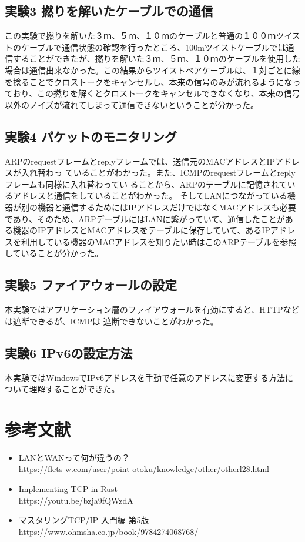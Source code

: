 \documentclass[10pt]{article}
\begin{document}
\subsection{実験3 撚りを解いたケーブルでの通信 }
この実験で撚りを解いた３ｍ、５ｍ、１０ｍのケーブルと普通の１００ｍツイストのケーブルで通信状態の確認を行ったところ、100mツイストケーブルでは通信することができたが、撚りを解いた３ｍ、５ｍ、１０ｍのケーブルを使用した場合は通信出来なかった。この結果からツイストペアケーブルは、１対ごとに線を捻ることでクロストークをキャンセルし、本来の信号のみが流れるようになっており、この撚りを解くとクロストークをキャンセルできなくなり、本来の信号以外のノイズが流れてしまって通信できないということが分かった。

\subsection{実験4 パケットのモニタリング}
ARPのrequestフレームとreplyフレームでは、送信元のMACアドレスとIPアドレスが入れ替わっ
ていることがわかった。また、ICMPのrequestフレームとreplyフレームも同様に入れ替わってい
ることから、ARPのテーブルに記憶されているアドレスと通信をしていることがわかった。
そしてLANにつながっている機器が別の機器と通信するためにはIPアドレスだけではなくMACアドレスも必要であり、そのため、ARPデーブルにはLANに繋がっていて、通信したことがある機器のIPアドレスとMACアドレスをテーブルに保存していて、あるIPアドレスを利用している機器のMACアドレスを知りたい時はこのARPテーブルを参照していることが分かった。

\subsection{実験5 ファイアウォールの設定 }
本実験ではアプリケーション層のファイアウォールを有効にすると、HTTPなどは遮断できるが、ICMPは
遮断できないことがわかった。

\subsection{実験6 IPv6の設定方法}
 本実験ではWindowsでIPv6アドレスを手動で任意のアドレスに変更する方法について理解することができた。
 
 \section{参考文献}
 \begin{itemize}
    \item LANとWANって何が違うの？\\
         https://flets-w.com/user/point-otoku/knowledge/other/otherl28.html
    \item Implementing TCP in Rust \\
        https://youtu.be/bzja9fQWzdA
    \item マスタリングTCP/IP 入門編 第5版 \\
        https://www.ohmsha.co.jp/book/9784274068768/
 
 \end{itemize}
 
\end{document}
